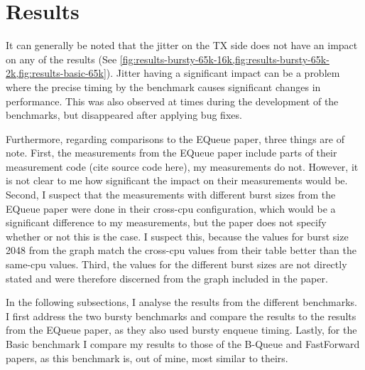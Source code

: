 \section{Results}
It can generally be noted that the jitter on the TX side does not have an impact on any of the results
(See \cref{fig:results-bursty-65k-16k,fig:results-bursty-65k-2k,fig:results-basic-65k}).
Jitter having a significant impact can be a problem where the precise timing by the benchmark causes significant changes in performance.
This was also observed at times during the development of the benchmarks, but disappeared after applying bug fixes.

Furthermore, regarding comparisons to the EQueue paper, three things are of note.
First, the measurements from the EQueue paper include parts of their measurement code (cite source code here), my measurements do not.
However, it is not clear to me how significant the impact on their measurements would be.
Second, I suspect that the measurements with different burst sizes from the EQueue paper were done in their cross-cpu configuration,
which would be a significant difference to my measurements, but the paper does not specify whether or not this is the case.
I suspect this, because the values for burst size 2048 from the graph match the cross-cpu values from their table better than the same-cpu values.
Third, the values for the different burst sizes are not directly stated and were therefore discerned from the graph included in the paper.

In the following subsections, I analyse the results from the different benchmarks.
I first address the two bursty benchmarks and compare the results to the results from the EQueue paper, as they also used bursty enqueue timing.
Lastly, for the Basic benchmark I compare my results to those of the B-Queue and FastForward papers, as this benchmark is, out of mine, most similar to theirs.






